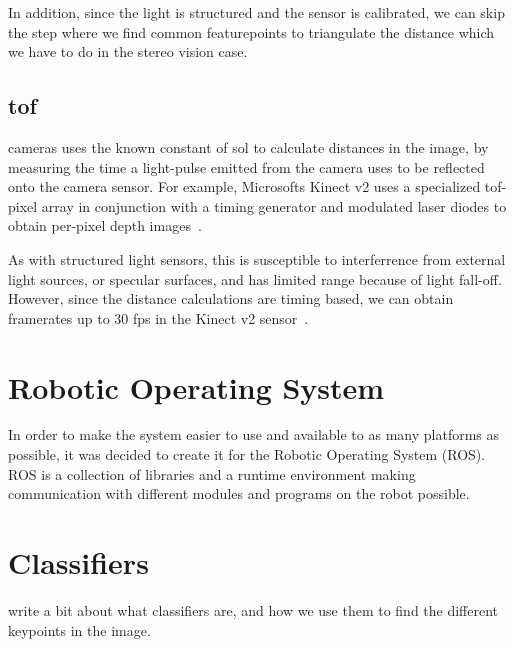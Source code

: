 \begin{appendices}
In addition, since the light is structured and the sensor is calibrated, we can skip the step where we find common featurepoints to triangulate the distance which we have to do in the stereo vision case.

\subsection{\acrlong{tof}} cameras uses the known constant of \gls{sol} to calculate distances in the image, by measuring the time a light-pulse emitted from the camera uses to be reflected onto the camera sensor. For example, Microsofts Kinect v2 uses a specialized \gls{tof}-pixel array in conjunction with a timing generator and modulated laser diodes to obtain per-pixel depth images~\cite{hotchipsTalk}.

As with structured light sensors, this is susceptible to interferrence from external light sources, or specular surfaces, and has limited range because of light fall-off. However, since the distance calculations are timing based, we can obtain framerates up to 30 fps in the Kinect v2 sensor~\cite{Lachat_2015}.



\section{Robotic Operating System}

In order to make the system easier to use and available to as many platforms as possible, it was decided to create it for the Robotic Operating System (ROS). ROS is a collection of libraries and a runtime environment making communication with different modules and programs on the robot possible. 

\section{Classifiers}

write a bit about what classifiers are, and how we use them to find the different keypoints in the image.

\end{appendices}
